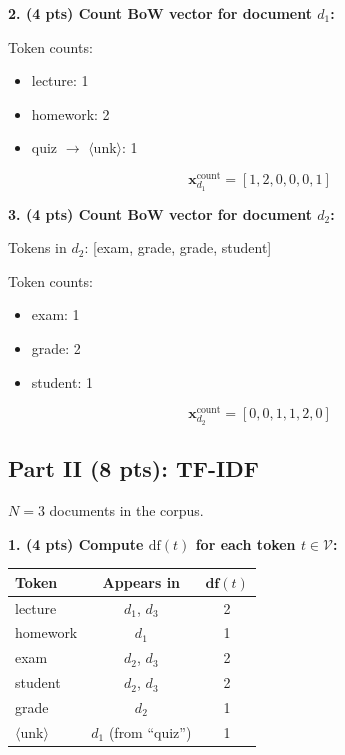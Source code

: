 \documentclass[11pt]{article}
\begin{document}
\vspace{1em}
\textbf{2. (4 pts) Count BoW vector for document $d_1$:}

Token counts:
\begin{itemize}[nosep]
    \item lecture: 1
    \item homework: 2
    \item quiz $\to$ $\langle$unk$\rangle$: 1
\end{itemize}

\[
\boxed{\mathbf{x}_{d_1}^{\text{count}} = [1, 2, 0, 0, 0, 1]}
\]

\vspace{1em}
\textbf{3. (4 pts) Count BoW vector for document $d_2$:}

Tokens in $d_2$: [exam, grade, grade, student]

Token counts:
\begin{itemize}[nosep]
    \item exam: 1
    \item grade: 2
    \item student: 1
\end{itemize}

\[
\boxed{\mathbf{x}_{d_2}^{\text{count}} = [0, 0, 1, 1, 2, 0]}
\]

\subsection*{Part II (8 pts): TF-IDF}

$N = 3$ documents in the corpus.

\textbf{1. (4 pts) Compute $\text{df}(t)$ for each token $t \in \mathcal{V}$:}

\begin{center}
\begin{tabular}{l|c|c}
\toprule
\textbf{Token} & \textbf{Appears in} & $\mathbf{df}(t)$ \\
\midrule
lecture & $d_1$, $d_3$ & 2 \\
homework & $d_1$ & 1 \\
exam & $d_2$, $d_3$ & 2 \\
student & $d_2$, $d_3$ & 2 \\
grade & $d_2$ & 1 \\
$\langle$unk$\rangle$ & $d_1$ (from ``quiz'') & 1 \\
\bottomrule
\end{tabular}
\end{center}
\end{document}
